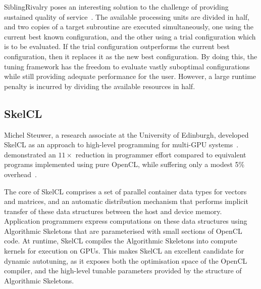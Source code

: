 SiblingRivalry poses an interesting solution to the challenge of
providing sustained quality of service~\cite{Ansel2012}. The available
processing units are divided in half, and two copies of a target
subroutine are executed simultaneously, one using the current best
known configuration, and the other using a trial configuration which
is to be evaluated. If the trial configuration outperforms the current
best configuration, then it replaces it as the new best
configuration. By doing this, the tuning framework has the freedom to
evaluate vastly suboptimal configurations while still providing
adequate performance for the user. However, a large runtime penalty is
incurred by dividing the available resources in half.

\subsection{SkelCL}
Michel Steuwer, a research associate at the University of Edinburgh,
developed SkelCL as an approach to high-level programming for
multi-GPU systems~\cite{Steuwer2011,
  Steuwer2013a}. \citeauthor{Steuwer2012} demonstrated an $11\times$
reduction in programmer effort compared to equivalent programs
implemented using pure OpenCL, while suffering only a modest 5\%
overhead~\cite{Steuwer2012}.

The core of SkelCL comprises a set of parallel container data types
for vectors and matrices, and an automatic distribution mechanism that
performs implicit transfer of these data structures between the host
and device memory. Application programmers express computations on
these data structures using Algorithmic Skeletons that are
parameterised with small sections of OpenCL code. At runtime, SkelCL
compiles the Algorithmic Skeletons into compute kernels for execution
on GPUs. This makes SkelCL an excellent candidate for dynamic
autotuning, as it exposes both the optimisation space of the OpenCL
compiler, and the high-level tunable parameters provided by the
structure of Algorithmic Skeletons.
